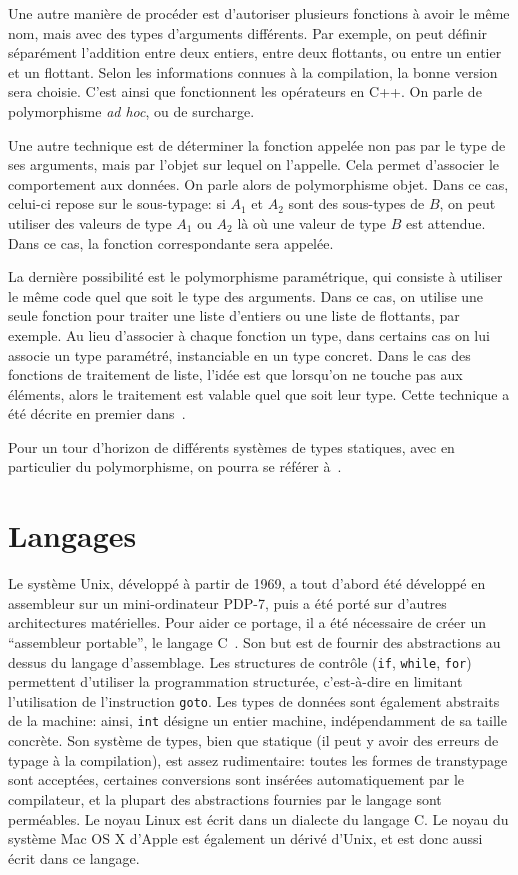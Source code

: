 Une autre manière de procéder est d'autoriser plusieurs fonctions à avoir le
même nom, mais avec des types d'arguments différents. Par exemple, on peut
définir séparément l'addition entre deux entiers, entre deux flottants, ou entre
un entier et un flottant. Selon les informations connues à la compilation, la
bonne version sera choisie. C'est ainsi que fonctionnent les opérateurs en C++.
On parle de polymorphisme \emph{ad hoc}, ou de surcharge.

Une autre technique est de déterminer la fonction appelée non pas par le type de
ses arguments, mais par l'objet sur lequel on l'appelle. Cela permet d'associer
le comportement aux données. On parle alors de polymorphisme objet. Dans ce cas,
celui-ci repose sur le sous-typage: si $A_1$ et $A_2$ sont des sous-types de
$B$, on peut utiliser des valeurs de type $A_1$ ou $A_2$ là où une valeur de
type $B$ est attendue. Dans ce cas, la fonction correspondante sera appelée.

La dernière possibilité est le polymorphisme paramétrique, qui consiste à
utiliser le \linebreak même code quel que soit le type des arguments. Dans ce
cas, on utilise une seule fonction pour traiter une liste d'entiers ou une liste
de flottants, par exemple. Au lieu d'associer à chaque fonction un type, dans
certains cas on lui associe un type paramétré, instanciable en un type concret.
Dans le cas des fonctions de traitement de liste, l'idée est que lorsqu'on ne
touche pas aux éléments, alors le traitement est valable quel que soit leur
type. Cette technique a été décrite en premier dans~\cite{Milner78}.

Pour un tour d'horizon de différents systèmes de types statiques, avec en
particulier du polymorphisme, on pourra se référer à~\cite{TAPL}.

\section{Langages}
\label{sec:lang-int}

Le système Unix, développé à partir de 1969, a tout d'abord été développé en
assembleur sur un mini-ordinateur PDP-7, puis a été porté sur d'autres
architectures matérielles. Pour aider ce portage, il a été nécessaire de créer
un \enquote{assembleur portable}, le langage C~\cite{KandR,AnsiC}. Son but est
de fournir des abstractions au dessus du langage d'assemblage. Les structures de
contrôle (\texttt{if}, \texttt{while}, \texttt{for}) permettent d'utiliser la
programmation structurée, c'est-à-dire en limitant l'utilisation de
l'instruction \texttt{goto}. Les types de données sont également abstraits de la
machine: ainsi, \texttt{int} désigne un entier machine, indépendamment de sa
taille concrète. Son système de types, bien que statique (il peut y avoir des
erreurs de typage à la compilation), est assez rudimentaire: toutes les formes
de transtypage sont acceptées, certaines conversions sont insérées
automatiquement par le compilateur, et la plupart des abstractions fournies par
le langage sont perméables. Le noyau Linux est écrit dans un dialecte du langage
C. Le noyau du système Mac OS X d'Apple est également un dérivé d'Unix, et est
donc aussi écrit dans ce langage.

